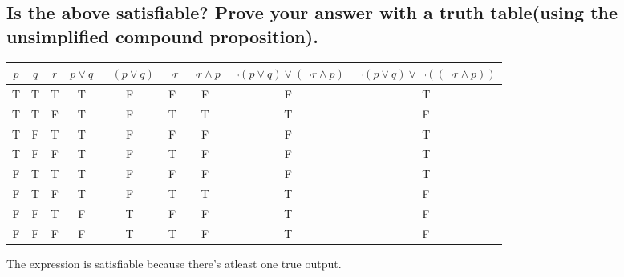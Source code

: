 \documentclass{article}
\begin{document}
    \subsection{Is the above satisfiable? Prove your answer with a truth table(using the unsimplified compound proposition).} 
        \begin{center}
            \begin{tabular}{|c|c|c|c|c|c|c|c|c|}
                \hline
                $p$ & $q$ & $r$ & $p \lor q$ & $\neg (p \lor q)$ & $\neg r$ & $\neg r \land p$ & $\neg (p \lor q) \lor (\neg r \land p)$ & $\neg (p \lor q) \lor \neg((\neg r \land p))$ \\
                \hline
                T & T & T & T & F & F & F & F & T \\
                T & T & F & T & F & T & T & T & F \\
                T & F & T & T & F & F & F & F & T \\
                T & F & F & T & F & T & F & F & T \\
                F & T & T & T & F & F & F & F & T\\
                F & T & F & T & F & T & T & T & F\\
                F & F & T & F & T & F & F & T & F \\
                F & F & F & F & T & T & F & T & F \\
                \hline
            \end{tabular}
        \end{center}
    The expression is satisfiable because there's atleast one true output. 
\end{document}
